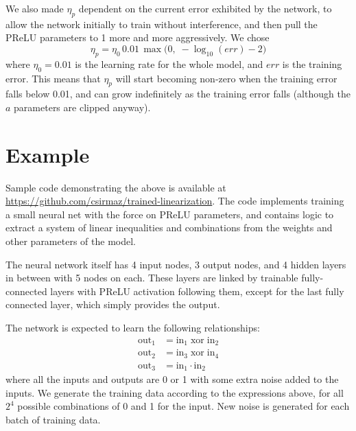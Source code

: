 \documentclass{article}[12pt]
\begin{document}
We also made $\eta_p$ dependent on the current error exhibited by the network,
to allow the network initially to train without interference, and then
pull the PReLU parameters to 1 more and more aggressively. We chose
\[ \eta_p = \eta_0\,0.01\,\max\big(0,\; -\log_{10}(err)-2\big) \]
where $\eta_0=0.01$ is the learning rate for the whole model, and $err$ is the training error.
This means that $\eta_p$ will start becoming non-zero when the training error
falls below 0.01, and can grow indefinitely as the training error falls
(although the $a$ parameters are clipped anyway).

\section{Example}

Sample code demonstrating the above is available at
\url{https://github.com/csirmaz/trained-linearization}.
The code implements training a small neural net with the force on PReLU parameters,
and contains logic to extract a system of linear inequalities and combinations
from the weights and other parameters of the model.

The neural network itself
has 4 input nodes, 3 output nodes, and
4 hidden layers in between with 5 nodes on each.
These layers are linked by trainable fully-connected layers
with PReLU activation following them, except for the last fully connected layer,
which simply provides the output.

The network is expected to learn the following relationships:
\begin{align}
\mathrm{out}_1 &= \mathrm{in}_1 \;\mathrm{xor}\; \mathrm{in}_2 \\
\mathrm{out}_2 &= \mathrm{in}_3 \;\mathrm{xor}\; \mathrm{in}_4 \\
\mathrm{out}_3 &= \mathrm{in}_1 \cdot \mathrm{in}_2
\end{align}
where all the inputs and outputs are 0 or 1 with some extra noise added to the inputs.
We generate the training data according to the expressions above, for all $2^4$ possible combinations of 0 and 1 for the input.
New noise is generated for each batch of training data.
\end{document}
